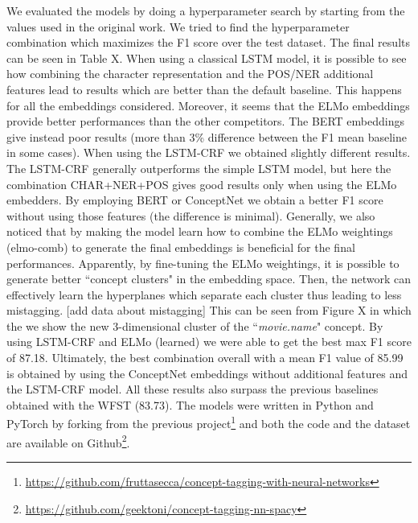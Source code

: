 \documentclass[11pt,a4paper]{article}
\begin{document}
We evaluated the models by doing a hyperparameter search by starting from the values used in the original work. We tried to find the hyperparameter combination which maximizes the F1 score over the test dataset. The final results can be seen in Table X.
When using a classical LSTM model, it is possible to see how combining the character representation and the POS/NER additional features lead to results which are better than the default baseline. This happens for all the embeddings considered. Moreover, it seems that the ELMo embeddings provide better performances than the other competitors. 
The BERT embeddings give instead poor results (more than 3\% difference between the F1 mean baseline in some cases).
When using the LSTM-CRF we obtained slightly different results. The LSTM-CRF generally outperforms the simple LSTM model, but here the combination CHAR+NER+POS gives good results only when using the ELMo embedders. By employing BERT or ConceptNet we obtain a better F1 score without using those features (the difference is minimal).
Generally, we also noticed that by making the model learn how to combine the ELMo weightings (elmo-comb) to generate the final embeddings is beneficial for the final performances. Apparently, by fine-tuning the ELMo weightings, it is possible to generate better ``concept clusters" in the embedding space.  Then, the network can effectively learn the hyperplanes which separate each cluster thus leading to less mistagging. [add data about mistagging]
This can be seen from Figure X in which the we show the new 3-dimensional cluster of the ``\textit{movie.name}" concept. 
By using LSTM-CRF and ELMo (learned) we were able to get the best max F1 score of 87.18. Ultimately, the best combination overall with a mean F1 value of  85.99 is obtained by using the ConceptNet embeddings without additional features and the LSTM-CRF model. All these results also surpass the previous baselines obtained with the WFST (83.73).
The models were written in Python and PyTorch by forking from the previous project\footnote{\url{https://github.com/fruttasecca/concept-tagging-with-neural-networks}} and both the code and the dataset are available on Github\footnote{\url{https://github.com/geektoni/concept-tagging-nn-spacy}}.
\end{document}

